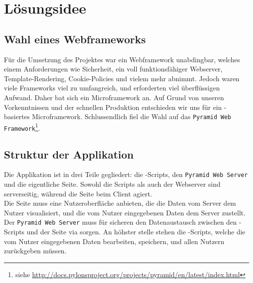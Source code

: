 \chapter{Lösungsidee}
\section{Wahl eines Webframeworks}
Für die Umsetzung des Projektes war ein Webframework unabdingbar, welches einem Anforderungen wie Sicherheit,  %
ein voll funktionsfähiger Webserver, Template-Rendering, Cookie-Policies und vielem mehr abnimmt. Jedoch waren %
viele Frameworks viel zu umfangreich, und erforderten viel überflüssigen Aufwand. Daher bat sich ein Microframework
an. Auf Grund von unseren Vorkenntnissen und der schnellen Produktion entschieden wir uns für ein \Python-basiertes
Microframework.
Schlussendlich fiel die Wahl auf das \texttt{Pyramid Web Framework}\footnote{siehe \url{http://docs.pylonsproject.org/projects/pyramid/en/latest/index.html}}.

\section{Struktur der Applikation}
Die Applikation ist in drei Teile gegliedert: die \Python-Scripts, den \texttt{Pyramid Web Server} und die eigentliche Seite.
Sowohl die Scripts als auch der Webserver sind serverseitig, während die Seite beim Client agiert.\\
Die Seite muss eine Nutzeroberfläche anbieten, die die Daten vom Server dem Nutzer visualisiert, und die vom
Nutzer eingegebenen Daten dem Server zustellt. Der \texttt{Pyramid Web Server} muss für sicheren den Datenaustausch zwischen den 
\Python-Scripts und der Seite via sorgen. An höhster stelle stehen die \Python-Scripts, welche die vom Nutzer eingegebenen Daten
bearbeiten, speichern, und allen Nutzern zurückgeben müssen.

 
